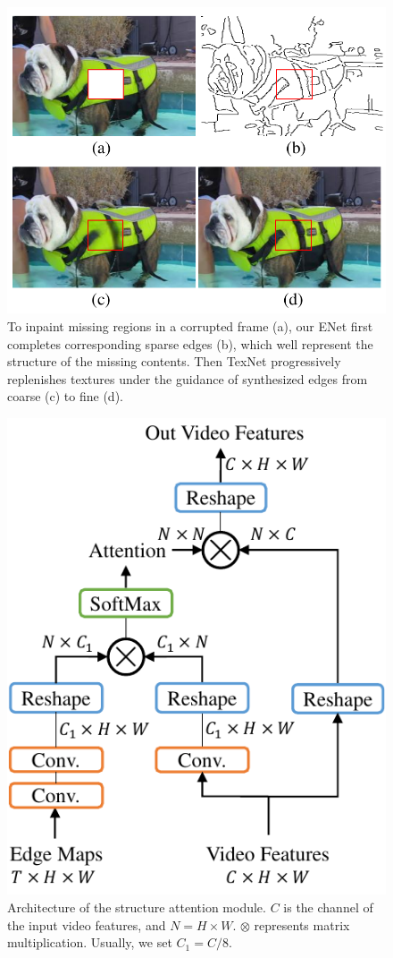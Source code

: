 \begin{figure}[t]
	\centering
	\includegraphics[width=0.8\columnwidth]{coars-fine} %
	\caption{To inpaint missing regions in a corrupted frame (a), our ENet first completes corresponding sparse edges (b), which well represent the structure of the missing contents. Then TexNet progressively replenishes textures under the guidance of synthesized edges from coarse (c) to fine (d).}
	
	\label{fig:coarse-fine}
\end{figure}




\begin{figure}[t]
	\centering
	\includegraphics[width=0.65\columnwidth]{SEM} %
	\caption{Architecture of the structure attention module. $C$ is the channel of the input video features, and $N=H\times W$. $\otimes$ represents matrix multiplication. Usually, we set $C_1=C/8$.}
	\label{SEM}
\end{figure} 




